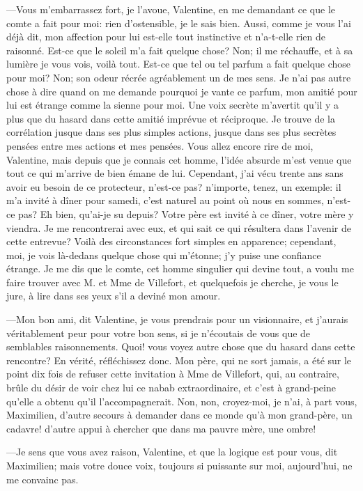 —Vous m'embarrassez fort, je l'avoue, Valentine, en me demandant ce que le comte a fait pour moi: rien d'ostensible, je le sais bien. Aussi, comme je vous l'ai déjà dit, mon affection pour lui est-elle tout instinctive et n'a-t-elle rien de raisonné. Est-ce que le soleil m'a fait quelque chose? Non; il me réchauffe, et à sa lumière je vous vois, voilà tout. Est-ce que tel ou tel parfum a fait quelque chose pour moi? Non; son odeur récrée agréablement un de mes sens. Je n'ai pas autre chose à dire quand on me demande pourquoi je vante ce parfum, mon amitié pour lui est étrange comme la sienne pour moi. Une voix secrète m'avertit qu'il y a plus que du hasard dans cette amitié imprévue et réciproque. Je trouve de la corrélation jusque dans ses plus simples actions, jusque dans ses plus secrètes pensées entre mes actions et mes pensées. Vous allez encore rire de moi, Valentine, mais depuis que je connais cet homme, l'idée absurde m'est venue que tout ce qui m'arrive de bien émane de lui. Cependant, j'ai vécu trente ans sans avoir eu besoin de ce protecteur, n'est-ce pas? n'importe, tenez, un exemple: il m'a invité à dîner pour samedi, c'est naturel au point où nous en sommes, n'est-ce pas? Eh bien, qu'ai-je su depuis? Votre père est invité à ce dîner, votre mère y viendra. Je me rencontrerai avec eux, et qui sait ce qui résultera dans l'avenir de cette entrevue? Voilà des circonstances fort simples en apparence; cependant, moi, je vois là-dedans quelque chose qui m'étonne; j'y puise une confiance étrange. Je me dis que le comte, cet homme singulier qui devine tout, a voulu me faire trouver avec M. et Mme de Villefort, et quelquefois je cherche, je vous le jure, à lire dans ses yeux s'il a deviné mon amour. 

—Mon bon ami, dit Valentine, je vous prendrais pour un visionnaire, et j'aurais véritablement peur pour votre bon sens, si je n'écoutais de vous que de semblables raisonnements. Quoi! vous voyez autre chose que du hasard dans cette rencontre? En vérité, réfléchissez donc. Mon père, qui ne sort jamais, a été sur le point dix fois de refuser cette invitation à Mme de Villefort, qui, au contraire, brûle du désir de voir chez lui ce nabab extraordinaire, et c'est à grand-peine qu'elle a obtenu qu'il l'accompagnerait. Non, non, croyez-moi, je n'ai, à part vous, Maximilien, d'autre secours à demander dans ce monde qu'à mon grand-père, un cadavre! d'autre appui à chercher que dans ma pauvre mère, une ombre! 

—Je sens que vous avez raison, Valentine, et que la logique est pour vous, dit Maximilien; mais votre douce voix, toujours si puissante sur moi, aujourd'hui, ne me convainc pas. 

